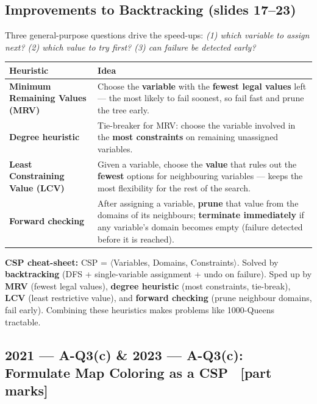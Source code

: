 \documentclass[12pt, a4paper]{article}
\newenvironment{answerbox}{\begin{mdframed}[style=answerframe]}{\end{mdframed}}
\begin{document}
\subsection{Improvements to Backtracking (slides 17--23)}

\noindent Three general-purpose questions drive the speed-ups: \emph{(1) which variable to assign next? (2) which value to try first? (3) can failure be detected early?}

\begin{center}
\renewcommand{\arraystretch}{1.4}
\small
\begin{tabular}{p{3.3cm}|p{9cm}}
\toprule
\textbf{Heuristic} & \textbf{Idea} \\
\midrule
\textbf{Minimum Remaining Values (MRV)} & Choose the \textbf{variable} with the \textbf{fewest legal values} left — the most likely to fail soonest, so fail fast and prune the tree early. \\
\textbf{Degree heuristic} & Tie-breaker for MRV: choose the variable involved in the \textbf{most constraints} on remaining unassigned variables. \\
\textbf{Least Constraining Value (LCV)} & Given a variable, choose the \textbf{value} that rules out the \textbf{fewest} options for neighbouring variables — keeps the most flexibility for the rest of the search. \\
\textbf{Forward checking} & After assigning a variable, \textbf{prune} that value from the domains of its neighbours; \textbf{terminate immediately} if any variable's domain becomes empty (failure detected before it is reached). \\
\bottomrule
\end{tabular}
\end{center}

\begin{answerbox}
\textbf{CSP cheat-sheet:} CSP = $\langle$Variables, Domains, Constraints$\rangle$. Solved by \textbf{backtracking} (DFS + single-variable assignment + undo on failure). Sped up by \textbf{MRV} (fewest legal values), \textbf{degree heuristic} (most constraints, tie-break), \textbf{LCV} (least restrictive value), and \textbf{forward checking} (prune neighbour domains, fail early). Combining these heuristics makes problems like 1000-Queens tractable.
\end{answerbox}

\subsection{2021 — A-Q3(c) \& 2023 — A-Q3(c): Formulate Map Coloring as a CSP \ [part marks]}
\end{document}
